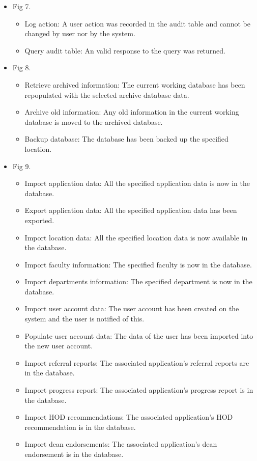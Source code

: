 \documentclass[12pt]{article}
\begin{document}
\begin{itemize}
	\item Fig 7.
		\begin{itemize}
			\item Log action: A user action was recorded in the audit table and cannot be changed by user nor by the system.
			\item Query audit table: An valid response to the query was returned.									
		\end{itemize}
	\item Fig 8.
		\begin{itemize}
			\item Retrieve archived information: The current working database has been repopulated with the selected archive database data.
			\item Archive old information: Any old information in the current working database is moved to the archived database.
			\item Backup database: The database has been backed up the specified location.									
		\end{itemize}
	\item Fig 9.
		\begin{itemize}
			\item Import application data: All the specified application data is now in the database.
			\item Export application data: All the specified application data has been exported.	
			\item Import location data: All the specified location data is now available in the database. 
			\item Import faculty information: The specified faculty is now in the database.
			\item Import departments information: The specified department is now in the database.
			\item Import user account data: The user account has been created on the system and the user is notified of this.
			\item Populate user account data: The data of the user has been imported into the new user account.
			\item Import referral reports: The associated application's referral reports are in the database.
			\item Import progress report: The associated application's progress report is in the database.
			\item Import HOD recommendations: The associated application's HOD recommendation is in the database.
			\item Import dean endorsements: The associated application's dean endorsement is in the database.

\end{itemize}
\end{itemize}
\end{document}
